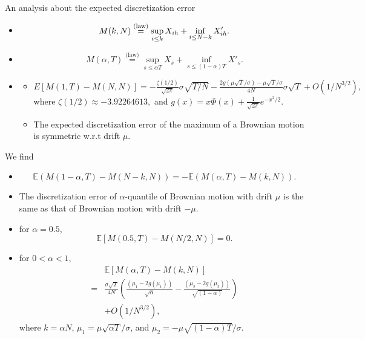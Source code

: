 \documentclass[cjk,10pt]{beamer}
\def\eqlaw{{\stackrel{\text{(law)}}{=}}}
\begin{document}
\begin{frame}{An analysis about the expected discretization error}\small
\begin{itemize}
\item
\cite{Wendel1960}
\[
M(k,N)\stackrel{\rm(law)}{=}\sup_{i\le k}X_{ih} + \inf_{i\le N-k}X'_{ih}.
\]
\item 
\cite{Dassios1995} 
\[
M(\alpha, T) \eqlaw \sup_{s \leq \alpha T} X_s + \inf_{s\leq (1-\alpha)T} X'_s.
\]
\item
\cite{Janssen2008}
\begin{itemize}
\item$\displaystyle
E[M(1,T)-M(N,N)]
= -\frac{\zeta(1/2)}{\sqrt{2\pi}}\sigma\sqrt{T/N} 
 -\frac{2g(\mu\sqrt{T}/\sigma)-\mu\sqrt{T}/ \sigma}{4N}\sigma\sqrt{T} 
 +O(1/N^{3/2}),$
where 
$
\zeta(1/2) \approx -3.92264613,
$
and 
$
g(x)=x \Phi(x) + \frac{1}{\sqrt{2\pi}} e^{-{x^2 /2 }}.
$
\item
The expected discretization error of the maximum of a Brownian motion is symmetric w.r.t drift $\mu$.
\end{itemize}
\end{itemize}
\end{frame}

\begin{frame}\small
We find 
\begin{itemize}
\item
\[
\mathbb {E}({M(1-\alpha,T) - M(N-k,N)})
=-\mathbb{E}({M(\alpha,T) -  M(k,N)}).
\]
\item
The discretization error of $\alpha$-quantile of Brownian motion with drift $\mu$ is the same as that of Brownian motion with drift $-\mu$.

\item
for $\alpha=0.5$, 
\[
\mathbb{E} [{M(0.5,T) - M(N/2,N)}]=0.
\] 

\item
for $0<\alpha<1$,
\[
\begin{split}
&\mathbb{E} [{M(\alpha,T) -  M(k,N)}]\\
=&\frac{\sigma\sqrt{T}}{4N}\left(\frac{(\mu_1 - 2g(\mu_1))}{\sqrt\alpha} - \frac{(\mu_2 - 2g(\mu_2))}{\sqrt{(1-\alpha)}}\right) \\
& + O(1/N^{{3}/{2}}),
\end{split}
\]
where $k = \alpha N$, $\mu_1 =\mu\sqrt{\alpha T}/\sigma$, and $\mu_2 =-\mu\sqrt{(1-\alpha)T}/\sigma$.

\end{itemize}
\end{frame}
\end{document}

